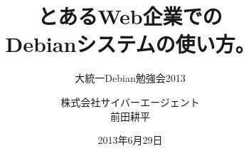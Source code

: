 




\documentclass[cjk,dvipdfmx,12pt]{beamer}
\usepackage{monthlypresentation}



\title{とあるWeb企業での\\Debianシステムの使い方。}
\subtitle{大統一Debian勉強会2013}
\author{株式会社サイバーエージェント\\前田耕平}
\date{2013年6月29日}



\frame{\titlepage{}}

\begin{frame}
 \frametitle{自己紹介}
  \begin{itemize}
   \item 株式会社サイバーエージェント所属
   \item 主にDC運用関連のソフトウェアの開発やってます
   \item Debian JP Project 2011, 2012年度会長でした
   \item 趣味でPythonでツール開発や、Python関連のDebianパッケージのメンテナンスやってます
   \item 仕事と趣味がほぼ一致
   \item 一児（おまめ\footnote{ネットでの通称}）と一匹（こまめ）の父親です
  \end{itemize}
\end{frame}


